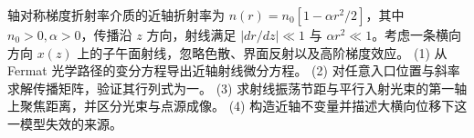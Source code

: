 轴对称梯度折射率介质的近轴折射率为 \(n(r)=n_0[1-\alpha r^2/2]\)，其中 \(n_0>0,\alpha>0\)，传播沿 \(z\) 方向，射线满足 \(|dr/dz|\ll1\) 与 \(\alpha r^2\ll1\)。考虑一条横向方向 \(x(z)\) 上的子午面射线，忽略色散、界面反射以及高阶梯度效应。
(1) 从 Fermat 光学路径的变分方程导出近轴射线微分方程。
(2) 对任意入口位置与斜率求解传播矩阵，验证其行列式为一。
(3) 求射线振荡节距与平行入射光束的第一轴上聚焦距离，并区分光束与点源成像。
(4) 构造近轴不变量并描述大横向位移下这一模型失效的来源。
